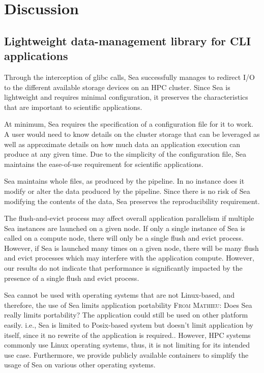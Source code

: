 \documentclass[10pt,journal,compsoc]{IEEEtran}
\newcommand{\MD}[1]{\color{magenta}\textsc{From Mathieu}: #1\xspace\color{black}}
\begin{document}
\section{Discussion}

    \subsection{Lightweight data-management library for CLI applications}

    Through the interception of glibc calls, Sea successfully manages to
    redirect I/O to the different available storage devices on an HPC cluster.
    Since Sea is lightweight and requires minimal configuration, it preserves
    the characteristics that are important to scientific applications.

    At minimum, Sea requires the specification of a configuration file for it to
    work. A user would need to know details on the cluster storage that can be
    leveraged as well as approximate details on how much data an application
    execution can produce at any given time. Due to the simplicity of the
    configuration file, Sea maintains the ease-of-use requirement for scientific
    applications.

    Sea maintains whole files, as produced by the pipeline. In no instance does
    it modify or alter the data produced by the pipeline. Since there is no risk
    of Sea modifying the contents of the data, Sea preserves the reproducibility
    requirement.

    The flush-and-evict process may affect overall application parallelism if multiple Sea instances
    are launched on a given node. If
    only a single instance of Sea is called on a compute node, there will only
    be a single flush and evict process. However, if Sea is launched many times on a given
    node, there will be many flush and evict processes which may interfere with
    the application compute. However, our results do not indicate that
    performance is significantly impacted by the presence of a single flush and
    evict process.  

    Sea cannot be used with operating systems that are not Linux-based, and
    therefore, the use of Sea limits application portability \MD{Does Sea really limits portability? The application could still be used on other platform easily. i.e., Sea is limited to Posix-based system but doesn't limit application by itself, since it no rewrite of the application is required.}. However, HPC
    systems commonly use Linux operating systems, thus, it is not limiting for
    its intended use case. Furthermore, we provide publicly available containers
    to simplify the usage of Sea on various other operating systems.
\end{document}
